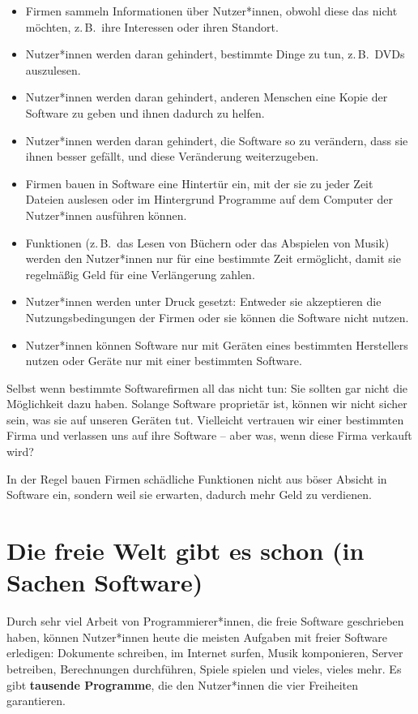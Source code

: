 \documentclass[a5paper,12pt]{scrartcl}
\begin{document}
\begin{itemize}
\item Firmen sammeln Informationen über Nutzer*innen, obwohl diese das
  nicht möchten, z.\,B.\ ihre Interessen oder ihren Standort.
\item Nutzer*innen werden daran gehindert, bestimmte Dinge zu tun,
  z.\,B.\ DVDs auszulesen.
\item Nutzer*innen werden daran gehindert, anderen Menschen eine Kopie
  der Software zu geben und ihnen dadurch zu helfen.
\item Nutzer*innen werden daran gehindert, die Software so zu
  verändern, dass sie ihnen besser gefällt, und diese Veränderung
  weiterzugeben.
\item Firmen bauen in Software eine Hintertür ein, mit der sie zu
  jeder Zeit Dateien auslesen oder im Hintergrund Programme auf dem
  Computer der Nutzer*innen ausführen können.
\item Funktionen (z.\,B.\ das Lesen von Büchern oder das Abspielen von
  Musik) werden den Nutzer*innen nur für eine bestimmte Zeit
  ermöglicht, damit sie regelmäßig Geld für eine Verlängerung zahlen.
\item Nutzer*innen werden unter Druck gesetzt: Entweder sie
  akzeptieren die Nutzungsbedingungen der Firmen oder sie können die
  Software nicht nutzen.
\item Nutzer*innen können Software nur mit Geräten eines bestimmten
  Herstellers nutzen oder Geräte nur mit einer bestimmten Software.
\end{itemize}

Selbst wenn bestimmte Softwarefirmen all das nicht tun: Sie sollten
gar nicht die Möglichkeit dazu haben. Solange Software proprietär ist,
können wir nicht sicher sein, was sie auf unseren Geräten
tut. Vielleicht vertrauen wir einer bestimmten Firma und verlassen uns
auf ihre Software -- aber was, wenn diese Firma verkauft wird?

In der Regel bauen Firmen schädliche Funktionen nicht aus böser
Absicht in Software ein, sondern weil sie erwarten, dadurch mehr Geld
zu verdienen.


\section{Die freie Welt gibt es schon (in Sachen Software)}

Durch sehr viel Arbeit von Programmierer*innen, die freie Software
geschrieben haben, können Nutzer*innen heute die meisten Aufgaben mit
freier Software erledigen: Dokumente schreiben, im Internet surfen,
Musik komponieren, Server betreiben, Berechnungen durchführen, Spiele
spielen und vieles, vieles mehr. Es gibt \textbf{tausende Programme},
die den Nutzer*innen die vier Freiheiten garantieren.
\end{document}
